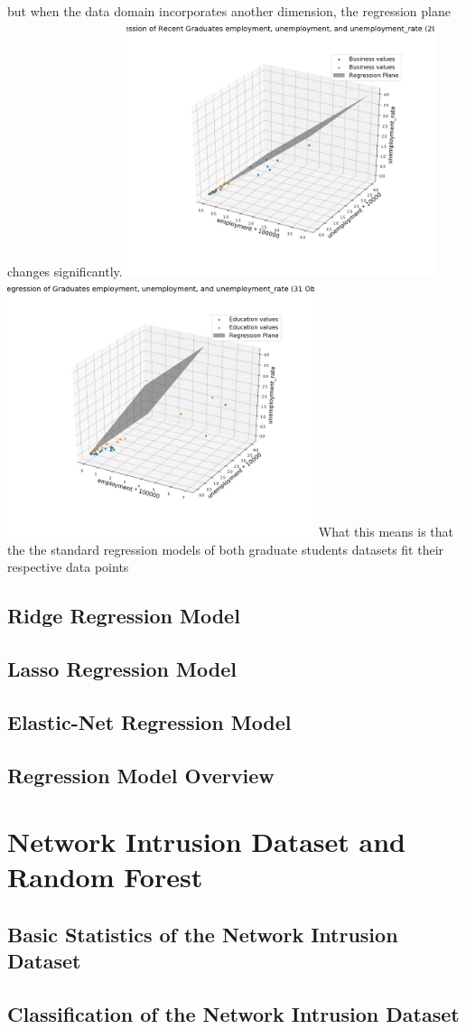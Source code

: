\documentclass[a4paper,12pt]{IEEEtran}
\begin{document}
but when the data domain incorporates another dimension, the regression plane changes significantly.
\includegraphics[width=9cm]{std_reg_2d_recent_grad} \includegraphics[width=9cm]{std_reg_2d_grad}
What this means is that the the standard regression models of both graduate students datasets fit their respective data points

\subsection{Ridge Regression Model}
\label{sec2}

\subsection{Lasso Regression Model}
\label{sec3}

\subsection{Elastic-Net Regression Model}
\label{sec4}

\subsection{Regression Model Overview}
\label{sec5}

\section{Network Intrusion Dataset and Random Forest}

\subsection{Basic Statistics of the Network Intrusion Dataset}
\label{sec6}

\subsection{Classification of the Network Intrusion Dataset}
\label{sec7}
\end{document}
